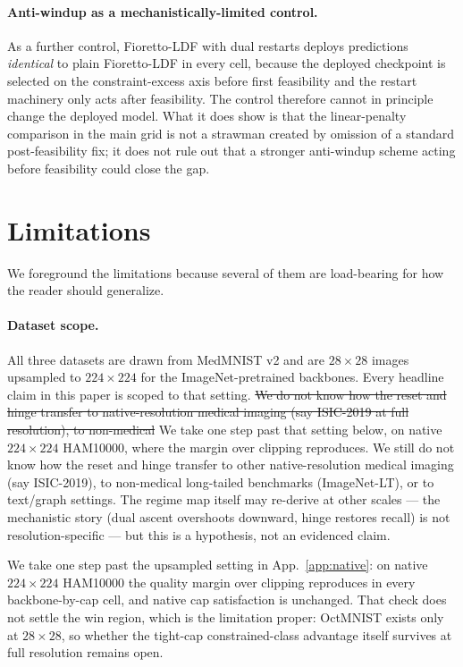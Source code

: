 \documentclass[10pt]{article}
\newcommand{\del}[1]{{\color{red}\sout{#1}}}
\begin{document}
\paragraph{Anti-windup as a mechanistically-limited control.}
As a further control, Fioretto-LDF with dual restarts
\citep{gallego2022controlled} deploys predictions \emph{identical} to
plain Fioretto-LDF in every cell, because the deployed checkpoint is
selected on the constraint-excess axis before first feasibility and the
restart machinery only acts after feasibility. The control therefore
cannot in principle change the deployed model. What it does show is that
the linear-penalty comparison in the main grid is not a strawman created
by omission of a standard post-feasibility fix; it does not rule out
that a stronger anti-windup scheme acting before feasibility could close
the gap.

\section{Limitations}
\label{sec:limits}

We foreground the limitations because several of them are load-bearing for
how the reader should generalize.

\paragraph{Dataset scope.}
All three datasets are drawn from MedMNIST v2 and are $28{\times}28$
images upsampled to $224{\times}224$ for the ImageNet-pretrained
backbones. Every headline claim in this paper is scoped to that setting.
\del{We do not know how the reset and hinge transfer to native-resolution
medical imaging (say ISIC-2019 at full resolution), to non-medical}
{\color{blue}We take one step past that setting below, on native
$224{\times}224$ HAM10000, where the margin over clipping reproduces. We
still do not know how the reset and hinge transfer to other
native-resolution medical imaging (say ISIC-2019), to non-medical}
long-tailed benchmarks (ImageNet-LT), or to text/graph settings. The
regime map itself may re-derive at other scales --- the mechanistic story
(dual ascent overshoots downward, hinge restores recall) is not
resolution-specific --- but this is a hypothesis, not an evidenced claim.

{\color{blue}We take one step past the upsampled setting in App.~\ref{app:native}:
on native $224{\times}224$ HAM10000 the quality margin over clipping reproduces in
every backbone-by-cap cell, and native cap satisfaction is unchanged. That check
does not settle the win region, which is the limitation proper: OctMNIST exists
only at $28{\times}28$, so whether the tight-cap constrained-class advantage itself
survives at full resolution remains open.}
\end{document}
